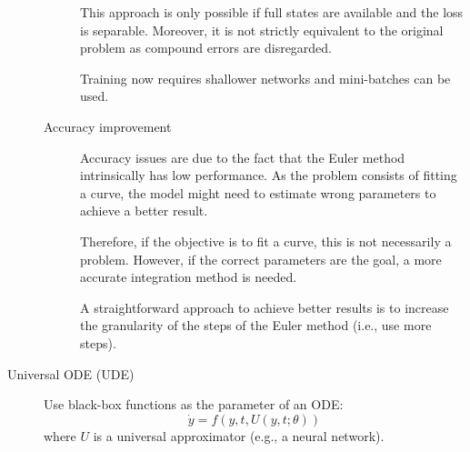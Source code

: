 \begin{description}
\begin{description}
                \begin{remark}
                    This approach is only possible if full states are available and the loss is separable. Moreover, it is not strictly equivalent to the original problem as compound errors are disregarded.
                \end{remark}

                \begin{remark}
                    Training now requires shallower networks and mini-batches can be used.
                \end{remark}

            \item[Accuracy improvement]
                Accuracy issues are due to the fact that the Euler method intrinsically has low performance. As the problem consists of fitting a curve, the model might need to estimate wrong parameters to achieve a better result. 

                Therefore, if the objective is to fit a curve, this is not necessarily a problem. However, if the correct parameters are the goal, a more accurate integration method is needed.

                \begin{remark}
                    A straightforward approach to achieve better results is to increase the granularity of the steps of the Euler method (i.e., use more steps).
                \end{remark}
        \end{description}

    \item[Universal ODE (UDE)] 
        Use black-box functions as the parameter of an ODE:
        \[ \dot{y} = f(y, t, U(y, t; \theta)) \]
        where $U$ is a universal approximator (e.g., a neural network).


\end{description}
